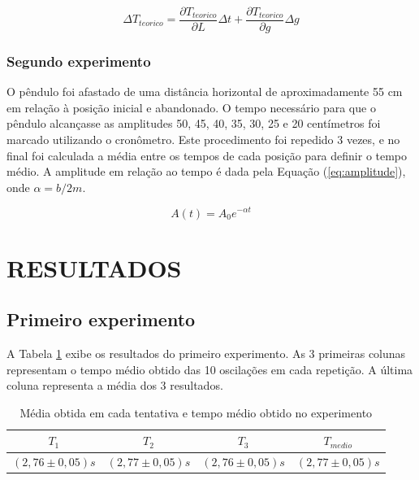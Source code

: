 \documentclass[10pt]{article}
\begin{document}
\begin{equation}
\Delta T_{teorico} = \frac{\partial T_{teorico}}{\partial L}\Delta t + \frac{\partial T_{teorico}}{\partial g}
\label{eq:derivada}\Delta g
\end{equation}

\subsubsection{Segundo experimento}

O pêndulo foi afastado de uma distância horizontal de aproximadamente 55 cm em relação à posição inicial e abandonado. O tempo necessário para que o pêndulo alcançasse as amplitudes 50, 45, 40, 35, 30, 25 e 20 centímetros foi marcado utilizando o cronômetro. Este procedimento foi repedido 3 vezes, e no final foi calculada a média entre os tempos de cada posição para definir o tempo médio. A amplitude em relação ao tempo é dada pela Equação (\ref{eq:amplitude}), onde $\alpha = b/2m$.

\begin{equation}
A(t) = A_0e^{-\alpha t}
\label{eq:amplitude}
\end{equation}

\section{RESULTADOS}

\subsection{Primeiro experimento}
A Tabela \ref{tab:table1} exibe os resultados do primeiro experimento. As 3 primeiras colunas representam o tempo médio obtido das 10 oscilações em cada repetição. A última coluna representa a média dos 3 resultados. 

\begin{table}[h!]
	\begin{center}
		\begin{tabular}{|c|c|c|c|}
			\hline
			$T_1$ & $T_2$ & $T_3$ & $T_{medio}$ \\
			\hline
			$(2,76 \pm 0,05)s$ & $(2,77 \pm 0,05)s$ & $(2,76 \pm 0,05)s$ & $(2,77 \pm 0,05)s$\\
			\hline			
		\end{tabular}
		\caption{Média obtida em cada tentativa e tempo médio obtido no experimento}
		\label{tab:table1}
	\end{center}
\end{table}
\end{document}
